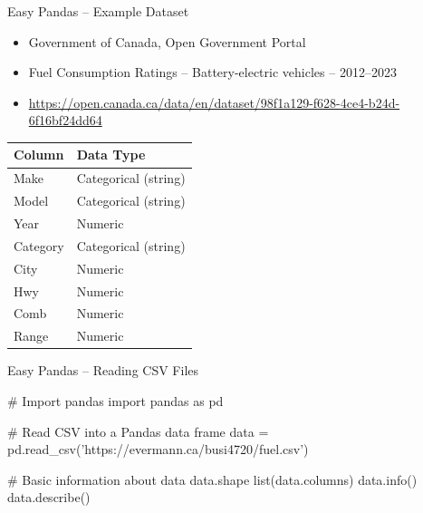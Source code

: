 \documentclass[ignorenonframetext,xcolor=x11names]{beamer}
\begin{document}
\begin{frame}[label=full]{Easy Pandas -- Example Dataset}
\begin{itemize}
  \item Government of Canada, Open Government Portal
  \item Fuel Consumption Ratings -- Battery-electric vehicles -- 2012--2023
  \item \href{https://open.canada.ca/data/en/dataset/98f1a129-f628-4ce4-b24d-6f16bf24dd64}{https://open.canada.ca/data/en/dataset/98f1a129-f628-4ce4-b24d-6f16bf24dd64}
\end{itemize} 

\vspace{\baselineskip}
\centering
\footnotesize
\renewcommand{\arraystretch}{1.25}
	\begin{tabular}{|l|l|} \hline
	  {\bf Column} & {\bf Data Type} \\ \hline \hline
	  Make & Categorical (string) \\ 
	  Model & Categorical (string) \\
	  Year & Numeric \\
	  Category & Categorical (string)\\
	  City & Numeric \\
	  Hwy & Numeric \\
	  Comb & Numeric \\
	  Range & Numeric \\ \hline
	\end{tabular}
\end{frame}

\begin{frame}[label=full,fragile]{Easy Pandas -- Reading CSV Files}
\begin{pythoncode}
# Import pandas 
import pandas as pd

# Read CSV into a Pandas data frame
data = pd.read_csv('https://evermann.ca/busi4720/fuel.csv')

# Basic information about data
data.shape
list(data.columns)
data.info()
data.describe()
\end{pythoncode}
\end{frame}
\end{document}

